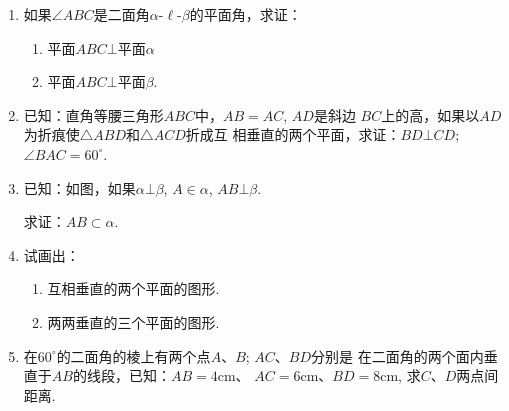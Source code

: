 \begin{ex}
\begin{enumerate}
  \item  如果$\angle ABC$是二面角$\alpha$-$\ell$-$\beta$的平面角，求证：
\begin{enumerate}
  \item 平面$ABC\bot $平面$\alpha$
  \item 平面$ABC\bot$平面$\beta$.
\end{enumerate}

  \item   已知：直角等腰三角形$ABC$中，$AB=AC$, $AD$是斜边
  $BC$上的高，如果以$AD$为折痕使$\triangle ABD$和$\triangle ACD$折成互
  相垂直的两个平面，求证：$BD\bot CD$; $\angle BAC=
  60^{\circ}$.
  \item  已知：如图，如果$\alpha\bot\beta$, $A\in\alpha$, $AB\bot\beta$.
  
  求证：$AB\subset \alpha$.

  \item  试画出：
\begin{enumerate}
  \item 互相垂直的两个平面的图形. 
  \item 两两垂直的三个平面的图形. 
\end{enumerate}

  \item  在$ 60^{\circ}$的二面角的棱上有两个点$A$、$B$; $AC$、$BD$分别是
  在二面角的两个面内垂直于$AB$的线段，已知：$AB=4$cm、
  $AC=6$cm、$BD=8$cm, 求$C$、$D$两点间距离. 
\end{enumerate}
\end{ex}

